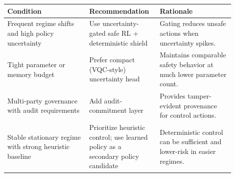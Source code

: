 \footnotesize
\setlength{\tabcolsep}{4pt}
\begin{tabular}{p{0.34\linewidth}p{0.27\linewidth}p{0.31\linewidth}}
\toprule
\textbf{Condition} & \textbf{Recommendation} & \textbf{Rationale} \\
\midrule
Frequent regime shifts and high policy uncertainty & Use uncertainty-gated safe RL + deterministic shield & Gating reduces unsafe actions when uncertainty spikes. \\
Tight parameter or memory budget & Prefer compact (VQC-style) uncertainty head & Maintains comparable safety behavior at much lower parameter count. \\
Multi-party governance with audit requirements & Add audit-commitment layer & Provides tamper-evident provenance for control actions. \\
Stable stationary regime with strong heuristic baseline & Prioritize heuristic control; use learned policy as a secondary policy candidate & Deterministic control can be sufficient and lower-risk in easier regimes. \\
\bottomrule
\end{tabular}
